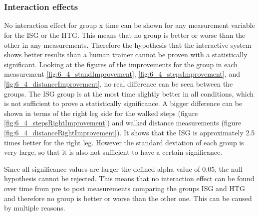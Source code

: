 \section{}\label{6_discussion}

\subsubsection{Interaction effects}
No interaction effect for group x time can be shown for any measurement variable for the ISG or the HTG.
This means that no group is better or worse than the other in any measurements.
Therefore the hypothesis that the interactive system shows better results than a human trainer cannot be proven with a statistically significant.
Looking at the figures of the improvements for the group in each measurement \ref{fig:6_4_standImprovement}, \ref{fig:6_4_stepsImprovement}, and \ref{fig:6_4_distanceImprovement}, no real difference can be seen between the groups.
The ISG group is at the most time slightly better in all conditions, which is not sufficient to prove a statistically significance.
A bigger difference can be shown in terms of the right leg side for the walked steps (figure \ref{fig:6_4_stepsRightImprovement}) and walked distance measurements (figure \ref{fig:6_4_distanceRightImprovement}).
It shows that the ISG is approximately 2.5 times better for the right leg.
However the standard deviation of each group is very large, so that it is also not sufficient to have a certain significance.

Since all significance values are larger the defined alpha value of 0.05, the null hypothesis cannot be rejected.
This means that no interaction effect can be found over time from pre to post measurements comparing the groups ISG and HTG and therefore no group is better or worse than the other one.
This can be caused by multiple reasons.

